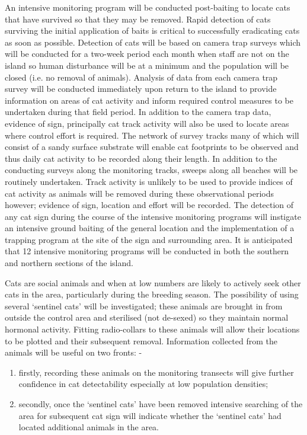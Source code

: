 \documentclass[version=last,
    paper=a4,                               %
    10pt,                                   %
    dvipsnames,
    oneside,                              %
    headings=openany,                       %
    open=any,
    BCOR=7mm,                               %
    DIV=15,     %
]{scrbook}
\begin{document}
An intensive monitoring program will be conducted post-baiting to locate
cats that have survived so that they may be removed. Rapid detection of
cats surviving the initial application of baits is critical to
successfully eradicating cats as soon as possible. Detection of cats
will be based on camera trap surveys which will be conducted for a
two-week period each month when staff are not on the island so human
disturbance will be at a minimum and the population will be closed (i.e.
no removal of animals). Analysis of data from each camera trap survey
will be conducted immediately upon return to the island to provide
information on areas of cat activity and inform required control
measures to be undertaken during that field period. In addition to the
camera trap data, evidence of sign, principally cat track activity will
also be used to locate areas where control effort is required. The
network of survey tracks many of which will consist of a sandy surface
substrate will enable cat footprints to be observed and thus daily cat
activity to be recorded along their length. In addition to the
conducting surveys along the monitoring tracks, sweeps along all beaches
will be routinely undertaken. Track activity is unlikely to be used to
provide indices of cat activity as animals will be removed during these
observational periods however; evidence of sign, location and effort
will be recorded. The detection of any cat sign during the course of the
intensive monitoring programs will instigate an intensive ground baiting
of the general location and the implementation of a trapping program at
the site of the sign and surrounding area. It is anticipated that 12
intensive monitoring programs will be conducted in both the southern and
northern sections of the island.

Cats are social animals and when at low numbers are likely to actively
seek other cats in the area, particularly during the breeding season.
The possibility of using several `sentinel cats' will be investigated;
these animals are brought in from outside the control area and
sterilised (not de-sexed) so they maintain normal hormonal activity.
Fitting radio-collars to these animals will allow their locations to be
plotted and their subsequent removal. Information collected from the
animals will be useful on two fronts: -

\begin{enumerate}
\itemsep1pt\parskip0pt
\item
  firstly, recording these animals on the monitoring transects will give
  further confidence in cat detectability especially at low population
  densities;
\item
  secondly, once the `sentinel cats' have been removed intensive
  searching of the area for subsequent cat sign will indicate whether
  the `sentinel cats' had located additional animals in the area.
\end{enumerate}
\end{document}
